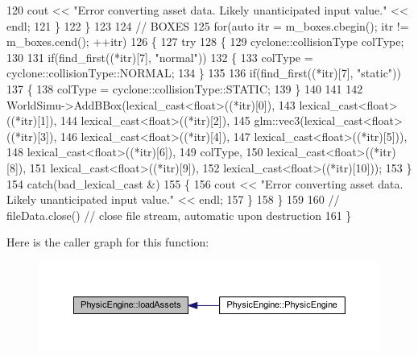 \begin{DoxyCode}
120             cout << \textcolor{stringliteral}{"Error converting asset data. Likely unanticipated input value."} << endl;
121         \}
122     \}
123 
124     \textcolor{comment}{// BOXES}
125     \textcolor{keywordflow}{for}(\textcolor{keyword}{auto} itr = m\_boxes.cbegin(); itr != m\_boxes.cend(); ++itr)
126     \{
127         \textcolor{keywordflow}{try}
128         \{
129             cyclone::collisionType colType;
130 
131             \textcolor{keywordflow}{if}(find\_first((*itr)[7], \textcolor{stringliteral}{"normal"}))
132             \{
133                 colType = cyclone::collisionType::NORMAL;
134             \}
135 
136             \textcolor{keywordflow}{if}(find\_first((*itr)[7], \textcolor{stringliteral}{"static"}))
137             \{
138                 colType = cyclone::collisionType::STATIC;
139             \}
140 
141             
142             WorldSimu->AddBBox(lexical\_cast<float>((*itr)[0]),
143                                lexical\_cast<float>((*itr)[1]),
144                                lexical\_cast<float>((*itr)[2]),
145                                   glm::vec3(lexical\_cast<float>((*itr)[3]),
146                                             lexical\_cast<float>((*itr)[4]),
147                                             lexical\_cast<float>((*itr)[5])),
148                                   lexical\_cast<float>((*itr)[6]),
149                                   colType,
150                                   lexical\_cast<float>((*itr)[8]),
151                                   lexical\_cast<float>((*itr)[9]),
152                                   lexical\_cast<float>((*itr)[10]));
153         \}
154         \textcolor{keywordflow}{catch}(bad\_lexical\_cast &)
155         \{
156             cout << \textcolor{stringliteral}{"Error converting asset data. Likely unanticipated input value."} << endl;
157         \}
158     \}
159 
160     \textcolor{comment}{// fileData.close() // close file stream, automatic upon destruction}
161 \}
\end{DoxyCode}


Here is the caller graph for this function\+:\nopagebreak
\begin{figure}[H]
\begin{center}
\leavevmode
\includegraphics[width=350pt]{d5/d43/class_physic_engine_a69ba663b63af3a75527ed45f0809a5ca_icgraph}
\end{center}
\end{figure}


